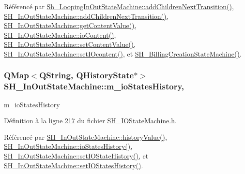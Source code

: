 Référencé par \hyperlink{classSh__LoopingInOutStateMachine_acfd8d0711c793b13c759f6c50be6a315}{Sh\-\_\-\-Looping\-In\-Out\-State\-Machine\-::add\-Children\-Next\-Transition()}, \hyperlink{classSH__InOutStateMachine_a689e5513ef6ef3fc1598efacd413372e}{S\-H\-\_\-\-In\-Out\-State\-Machine\-::add\-Children\-Next\-Transition()}, \hyperlink{classSH__InOutStateMachine_a2cdd914f1e597ac52d021106eec75c89}{S\-H\-\_\-\-In\-Out\-State\-Machine\-::get\-Content\-Value()}, \hyperlink{classSH__InOutStateMachine_a79b456cb2e353cb61ef9fe19c97fc8fb}{S\-H\-\_\-\-In\-Out\-State\-Machine\-::io\-Content()}, \hyperlink{classSH__InOutStateMachine_aa2766b7a7ba39c35a10df7fc0c151b4f}{S\-H\-\_\-\-In\-Out\-State\-Machine\-::set\-Content\-Value()}, \hyperlink{classSH__InOutStateMachine_a23a925522339132a51d16a7cff9074b9}{S\-H\-\_\-\-In\-Out\-State\-Machine\-::set\-I\-Ocontent()}, et \hyperlink{classSH__BillingCreationStateMachine_ad62b77fa4aeafe200056ff3974562f83}{S\-H\-\_\-\-Billing\-Creation\-State\-Machine()}.

\hypertarget{classSH__InOutStateMachine_aaca2ea542b3f5b4cd238396b07492455}{
\subsubsection[{m\-\_\-io\-States\-History}]{\setlength{\rightskip}{0pt plus 5cm}Q\-Map$<$Q\-String, Q\-History\-State$\ast$$>$ S\-H\-\_\-\-In\-Out\-State\-Machine\-::m\-\_\-io\-States\-History\hspace{0.3cm}{\ttfamily [protected]}, {\ttfamily [inherited]}}}\label{classSH__InOutStateMachine_aaca2ea542b3f5b4cd238396b07492455}


m\-\_\-io\-States\-History 



Définition à la ligne \hyperlink{SH__IOStateMachine_8h_source_l00217}{217} du fichier \hyperlink{SH__IOStateMachine_8h_source}{S\-H\-\_\-\-I\-O\-State\-Machine.\-h}.



Référencé par \hyperlink{classSH__InOutStateMachine_a84fb2b2c2105cae9c590c0d15960854a}{S\-H\-\_\-\-In\-Out\-State\-Machine\-::history\-Value()}, \hyperlink{classSH__InOutStateMachine_a4ec3ebb4c40ea57c63afdf5976e62a94}{S\-H\-\_\-\-In\-Out\-State\-Machine\-::io\-States\-History()}, \hyperlink{classSH__InOutStateMachine_a4b72e6da839782a211692a4d728c3925}{S\-H\-\_\-\-In\-Out\-State\-Machine\-::set\-I\-O\-State\-History()}, et \hyperlink{classSH__InOutStateMachine_ab35839e7880506286ebb5a11c2a924c2}{S\-H\-\_\-\-In\-Out\-State\-Machine\-::set\-I\-O\-States\-History()}.

